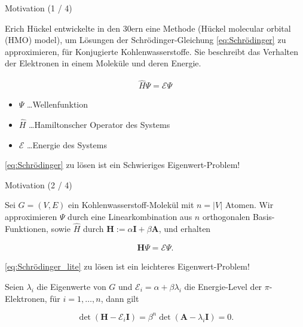 \documentclass[aspectratio = 169]{beamer}
\begin{document}

\begin{frame}{Motivation (1 / 4)}

    \begin{block}{}

        Erich Hückel entwickelte in den 30ern eine Methode (Hückel molecular orbital (HMO) model), um Lösungen der Schrödinger-Gleichung \eqref{eq:Schrödinger} zu approximieren, für Konjugierte Kohlenwasserstoffe.
        Sie beschreibt das Verhalten der Elektronen in einem Moleküle und deren Energie.

        \begin{align} \label{eq:Schrödinger}
            \hat H \Psi = \mathcal E \Psi
        \end{align}

        \begin{itemize}
            \item $\Psi$ \dots Wellenfunktion
            \item $\hat H$ \dots Hamiltonscher Operator des Systems
            \item $\mathcal E$ \dots Energie des Systems
        \end{itemize}

        \eqref{eq:Schrödinger} zu lösen ist ein Schwieriges Eigenwert-Problem!

    \end{block}

\end{frame}


\begin{frame}{Motivation (2 / 4)}

    \begin{block}{}

        Sei $G = (V, E)$ ein Kohlenwasserstoff-Molekül mit $n = |V|$ Atomen.
        Wir approximieren $\Psi$ durch eine Linearkombination aus $n$ orthogonalen Basis-Funktionen, sowie $\hat H$ durch $\mathbf H := \alpha \mathbf I + \beta \mathbf A$, und erhalten

        \begin{align} \label{eq:Schrödinger_lite}
            \mathbf H \Psi = \mathcal E \Psi.
        \end{align}

        \eqref{eq:Schrödinger_lite} zu lösen ist ein leichteres Eigenwert-Problem!

        Seien $\lambda_i$ die Eigenwerte von $G$ und $\mathcal E_i = \alpha + \beta \lambda_i$ die Energie-Level der $\pi$-Elektronen, für $i = 1, \dots, n$, dann gilt

        \[
            \det(\mathbf H - \mathcal E_i \mathbf I)
            =
            \beta^n \det(\mathbf A - \lambda_i \mathbf I)
            =
            0.
        \]

    \end{block}

\end{frame}
\end{document}
